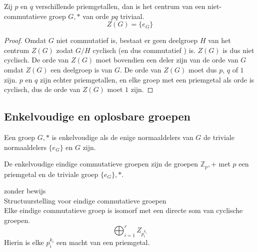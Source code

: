\documentclass[main.tex]{subfiles}
\begin{document}
\begin{gev}
  Zij $p$ en $q$ verschillende priemgetallen, dan is het centrum van een niet-commutatieve groep $G,*$ van orde $pq$ triviaal.
  \[ Z(G) = \{ e_{G} \} \]

  \begin{proof}
    Omdat $G$ niet commutatief is, bestaat er geen deelgroep $H$ van het centrum $Z(G)$ zodat $G/H$ cyclisch (en dus commutatief ) is.
    $Z(G)$ is dus niet cyclisch.
    De orde van $Z(G)$ moet bovendien een deler zijn van de orde van $G$ omdat $Z(G)$ een deelgroep is van $G$. 
    De orde van $Z(G)$ moet dus $p$, $q$ of $1$ zijn. $p$ en $q$ zijn echter priemgetallen, en elke groep met een priemgetal als orde is cyclisch, dus de orde van $Z(G)$ moet $1$ zijn.
  \end{proof}
\end{gev}

\subsection{Enkelvoudige en oplosbare groepen}
\label{sec:enkelv-en-oplosb}

\begin{de}
  Een groep $G,*$ is enkelvoudige als de enige normaaldelers van $G$ de triviale normaaldelers $\{e_{G}\}$ en $G$ zijn.
\end{de}


\begin{pr}
  De enkelvoudige eindige commutatieve groepen zijn de groepen $\mathbb{Z}_{p},+$ met $p$ een priemgetal en de triviale groep $\{e_{G}\},*$.
  
\end{pr}

\begin{st}
  zonder bewijs\\
  Structuurstelling voor eindige commutatieve groepen\\
  Elke eindige commutatieve groep is isomorf met een directe som van cyclische groepen.
  \[ \bigoplus_{i=1}^{r} Z_{p_{i}^{k_{i}}} \]
  Hierin is elke $p_{i}^{k_{i}}$ een macht van een priemgetal.
\end{st}
\end{document}
